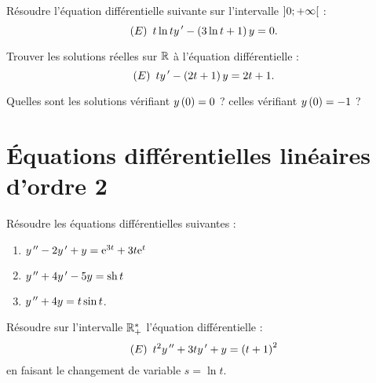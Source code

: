 \begin{exo}
Résoudre l'équation différentielle suivante sur l'intervalle \(\left]0;+\infty\right[\) : \[\left(E\right)~t\ln ty^{\,\prime}-\left(3\ln t+1\right)y=0.\]
\end{exo}

\begin{corr}
\end{corr}

\begin{exo}[Exercice 8]
Trouver les solutions réelles sur \(\mathbb{R}\) à l'équation différentielle : \[\left(E\right)~ty^{\,\prime}-\left(2t+1\right)y=2t+1.\]

Quelles sont les solutions vérifiant \(y\left(0\right)=0\) ? celles vérifiant \(y\left(0\right)=-1\) ?
\end{exo}

\begin{corr}
\end{corr}

\section{Équations différentielles linéaires d'ordre 2}

\begin{exo}[Exercice 9]
Résoudre les équations différentielles suivantes :

\begin{enumerate}
    \item \(y^{\,\prime\prime}-2y^{\,\prime}+y=\mathrm{e}^{3t}+3t\mathrm{e}^{t}\) \\
    \item \(y^{\,\prime\prime}+4y^{\,\prime}-5y=\operatorname{sh} t\) \\
    \item \(y^{\,\prime\prime}+4y=t\sin t\).
\end{enumerate}
\end{exo}

\begin{corr}
\end{corr}

\begin{exo}[Exercice 10]
Résoudre sur l'intervalle \(\mathbb{R}_+^*\) l'équation différentielle : \[\left(E\right)~t^2y^{\,\prime\prime}+3ty^{\,\prime}+y=\left(t+1\right)^2\] en faisant le changement de variable \(s=\ln t\).
\end{exo}

